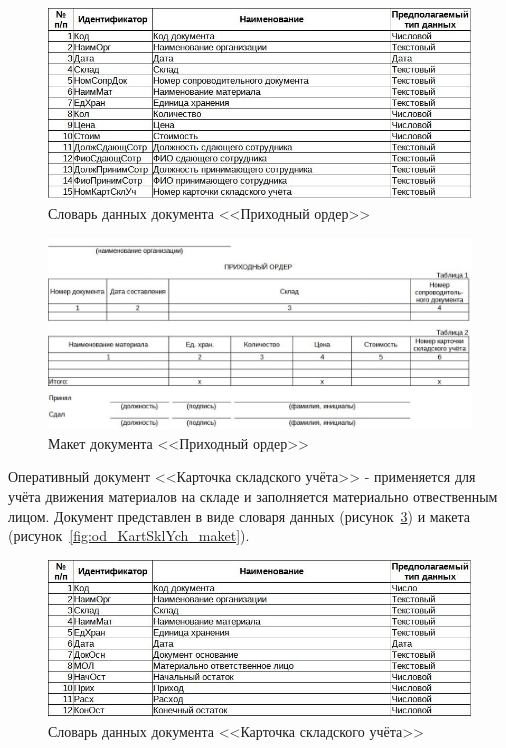 \documentclass[12pt, a4paper, simple]{eskdtext}
\begin{document}
    \begin{figure}[!h]
        \centering
        \includegraphics[width=14cm]
            {_docs/ОП_ПрихОрд_типы.jpg}
        \caption{Словарь данных документа <<Приходный ордер>>}
        \label{fig:od_PrihOrd_tipi}
    \end{figure}

    \begin{figure}[!h]
        \centering
        \includegraphics[width=14cm]
            {_docs/ОП_ПрихОрд_макет.jpg}
        \caption{Макет документа <<Приходный ордер>>}
        \label{fig:od_PrihOrd_maket}
    \end{figure}


    \newpage
    Оперативный документ <<Карточка складского учёта>> - применяется для учёта движения материалов на складе
    и заполняется материально отвественным лицом.
    Документ представлен в виде словаря данных (рисунок~\ref{fig:od_KartSklYch_tipi})
    и макета (рисунок~\ref{fig:od_KartSklYch_maket}).

    \begin{figure}[!h]
        \centering
        \includegraphics[width=14cm]
            {_docs/ОП_КартСклУч_типы.jpg}
        \caption{Словарь данных документа <<Карточка складского учёта>>}
        \label{fig:od_KartSklYch_tipi}
    \end{figure}
\end{document}
